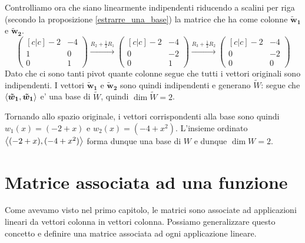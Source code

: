 \begin{solution}
\begin{enumerate}
        Controlliamo ora che siano linearmente indipendenti riducendo a scalini per riga (secondo la proposizione \ref{estrarre_una_base}) la matrice che ha come colonne $\bm{\tilde{w}_1}$ e $\bm{\tilde{w}_2}$.
        \begin{equation*}
            \begin{pmatrix}[c|c]
                -2 & -4 \\ 1 & 0 \\ 0 & 1
            \end{pmatrix} \xrightarrow[]{R_2 + \frac12R_1}
            \begin{pmatrix}[c|c]
                -2 & -4 \\ 0 & -2 \\ 0 & 1
            \end{pmatrix} \xrightarrow[]{R_3 + \frac12R_2}
            \begin{pmatrix}[c|c]
                -2 & -4 \\ 0 & -2 \\ 0 & 0
            \end{pmatrix}
        \end{equation*}
        Dato che ci sono tanti pivot quante colonne segue che tutti i vettori originali sono indipendenti.
        I vettori $\bm{\tilde{w}_1}$ e $\bm{\tilde{w}_2}$ sono quindi indipendenti e generano $\widetilde{W}$: segue che $\left\langle \bm{\tilde{w}_1}, \bm{\tilde{w}_1} \right\rangle$ e' una base di $\widetilde{W}$, quindi $\dim \widetilde{W} = 2$.

        Tornando allo spazio originale, i vettori corrispondenti alla base sono quindi $w_1(x) = (-2 + x)$ e $w_2(x) = (-4 + x^2)$. L'insieme ordinato $\left\langle (-2+x), (-4+x^2) \right\rangle$ forma dunque una base di $W$ e dunque $\dim W = 2$.
    \end{enumerate}
\end{solution}

\section{Matrice associata ad una funzione}

Come avevamo visto nel primo capitolo, le matrici sono associate ad applicazioni lineari da vettori colonna in vettori colonna. Possiamo generalizzare questo concetto e definire una matrice associata ad ogni applicazione lineare.

